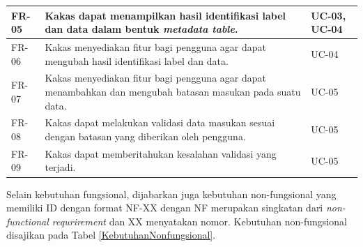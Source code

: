 \begin{small}
\begin{longtable}{ | p{2cm} | p{6cm} | p{4cm} | }
		FR-05                   & Kakas dapat menampilkan hasil identifikasi label dan data dalam bentuk \textit{metadata table}.                                                                                                                                  & UC-03, UC-04                                                    \\ \hline
		FR-06                   & Kakas menyediakan fitur bagi pengguna agar dapat mengubah hasil identifikasi label dan data.                                                                                                                                     & UC-04                                                           \\ \hline
		FR-07                   & Kakas menyediakan fitur bagi pengguna agar dapat menambahkan dan mengubah batasan masukan pada suatu data.                                                                                                                       & UC-05                                                           \\ \hline
		FR-08                   & Kakas dapat melakukan validasi data masukan sesuai dengan batasan yang diberikan oleh pengguna.                                                                                                                                  & UC-05                                                           \\ \hline
		FR-09                   & Kakas dapat memberitahukan kesalahan validasi yang terjadi.                                                                                                                                                                      & UC-05                                                           \\ \hline
	\end{longtable}
\end{small}

Selain kebutuhan fungsional, dijabarkan juga kebutuhan non-fungsional yang memiliki ID dengan format NF-XX dengan NF merupakan singkatan dari \textit{non-functional requrirement} dan XX menyatakan nomor. Kebutuhan non-fungsional disajikan pada Tabel \ref{KebutuhanNonfungsional}.

